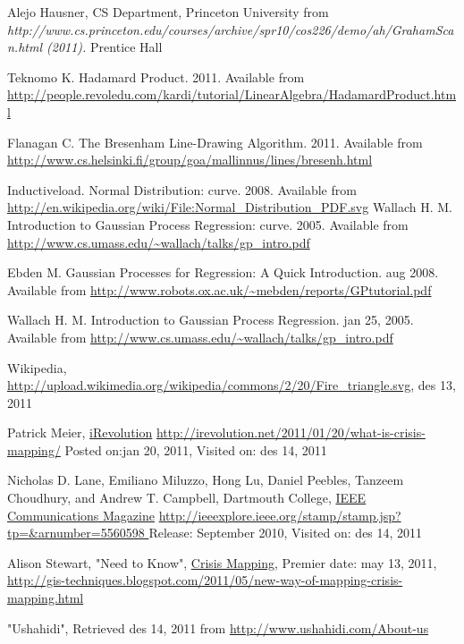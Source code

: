 
\begin{thebibliography}{4}
 Alejo Hausner, CS Department, Princeton University from
 \emph{http://www.cs.princeton.edu/courses/archive/spr10/cos226/demo/ah/GrahamScan.html (2011).} Prentice Hall
 
 Teknomo K. Hadamard Product. 2011. Available from \url{http://people.revoledu.com/kardi/tutorial/LinearAlgebra/HadamardProduct.html} 

 Flanagan C. The Bresenham Line-Drawing Algorithm. 2011. Available from \url{http://www.cs.helsinki.fi/group/goa/mallinnus/lines/bresenh.html} 

 Inductiveload. Normal Distribution: curve. 2008. Available from \url{http://en.wikipedia.org/wiki/File:Normal_Distribution_PDF.svg} 
 Wallach H. M. Introduction to Gaussian Process Regression: curve. 2005. Available from \url{http://www.cs.umass.edu/~wallach/talks/gp_intro.pdf} 

 Ebden M. Gaussian Processes for Regression: A Quick Introduction. aug 2008. Available from \url{http://www.robots.ox.ac.uk/~mebden/reports/GPtutorial.pdf} 


 Wallach H. M. Introduction to Gaussian Process Regression. jan 25, 2005. Available from \url{http://www.cs.umass.edu/~wallach/talks/gp_intro.pdf} 

 Wikipedia,       \url{http://upload.wikimedia.org/wikipedia/commons/2/20/Fire_triangle.svg}, des 13, 2011

 Patrick Meier, \underline{iRevolution} \url{http://irevolution.net/2011/01/20/what-is-crisis-mapping/} Posted on:jan 20, 2011, Visited on: des 14, 2011

 Nicholas D. Lane, Emiliano Miluzzo, Hong Lu, Daniel Peebles, Tanzeem Choudhury,
and Andrew T. Campbell, Dartmouth College, \underline{IEEE Communications Magazine} \url{http://ieeexplore.ieee.org/stamp/stamp.jsp?tp=&arnumber=5560598 } Release: September 2010, Visited on: des 14, 2011

 Alison Stewart, "Need to Know", \underline{Crisis Mapping}, Premier date: may 13, 2011, \url{http://gis-techniques.blogspot.com/2011/05/new-way-of-mapping-crisis-mapping.html}

 "Ushahidi", Retrieved des 14, 2011 from \url{http://www.ushahidi.com/About-us}


\end{thebibliography}

